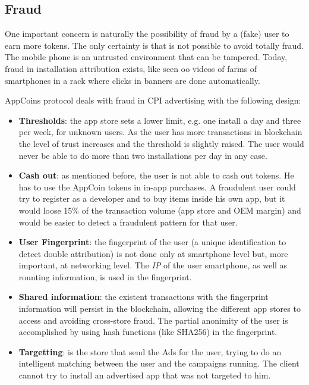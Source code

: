 \subsection{Fraud}

One important concern is naturally the possibility of fraud by a (fake) user to earn more tokens. The only certainty is that is not possible to avoid totally fraud. The mobile phone is an untrusted environment that can be tampered. Today, fraud in installation attribution exists, like seen oo videos of farms of smartphones in a rack where clicks in banners are done automatically.

AppCoins protocol deals with fraud in CPI advertising with the following design: 

\begin{itemize}
\item {\bf Thresholds}: the app store sets a lower limit, e.g. one install a day and three per week, for unknown users. As the user has more transactions in blockchain the level of trust increases and the threshold is slightly raised. The user would never be able to do more than two installations per day in any case. 
\item {\bf Cash out}: as mentioned before, the user is not able to cash out tokens. He has to use the AppCoin tokens in in-app purchases. A fraudulent user could try to register as a developer and to buy items inside his own app, but it would loose 15\% of the transaction volume (app store and OEM margin) and would be easier to detect a fraudulent pattern for that user. 
\item {\bf User Fingerprint}: the fingerprint of the user (a unique identification to detect double attribution) is not done only at smartphone level but, more important, at networking level. The  {\em IP} of the user smartphone, as well as rounting information, is used in the fingerprint.
\item {\bf Shared information}: the existent transactions with the fingerprint information will persist in the blockchain, allowing the different app stores to access and avoiding cross-store fraud. The partial anonimity of the user is accomplished by using hash functions (like SHA256) in the fingerprint. 
\item {\bf Targetting}: is the store that send the Ads for the user, trying to do an intelligent matching between the user and the campaigns running. The client cannot try to install an advertised app that was not targeted to him.
\end{itemize}

